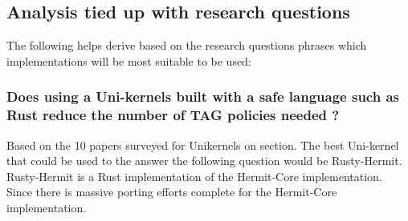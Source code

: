 






\subsection{Analysis tied up with research questions}
The following helps derive based on the research questions phrases which implementations 
will be most suitable to be used: 

\subsubsection{Does using a Uni-kernels built with a safe language such as Rust reduce the number of TAG policies needed ?}
Based on the 10 papers surveyed for Unikernels on section. The best Uni-kernel that could 
be used to the answer the following question would be Rusty-Hermit. Rusty-Hermit is a Rust 
implementation of the Hermit-Core implementation. Since there is massive porting efforts complete 
for the Hermit-Core implementation.






































